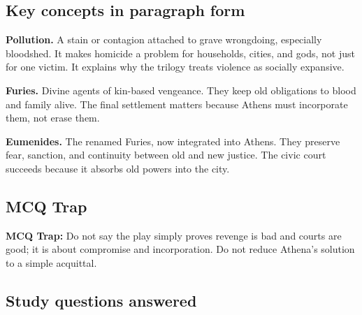 \documentclass[11pt]{article}
\begin{document}
\subsection{Key concepts in paragraph form}

\textbf{Pollution.} A stain or contagion attached to grave wrongdoing, especially bloodshed. It makes homicide a problem for households, cities, and gods, not just for one victim. It explains why the trilogy treats violence as socially expansive.

\textbf{Furies.} Divine agents of kin-based vengeance. They keep old obligations to blood and family alive. The final settlement matters because Athens must incorporate them, not erase them.

\textbf{Eumenides.} The renamed Furies, now integrated into Athens. They preserve fear, sanction, and continuity between old and new justice. The civic court succeeds because it absorbs old powers into the city.

\subsection{MCQ Trap}

\begin{quotebox}
\textbf{MCQ Trap:} Do not say the play simply proves revenge is bad and courts are good; it is about compromise and incorporation. Do not reduce Athena's solution to a simple acquittal.
\end{quotebox}

\subsection{Study questions answered}
\end{document}
